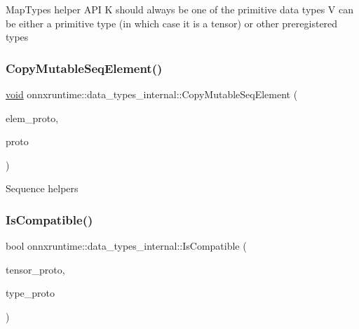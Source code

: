 Map\+Types helper A\+PI K should always be one of the primitive data types V can be either a primitive type (in which case it is a tensor) or other preregistered types \mbox{\label{namespaceonnxruntime_1_1data__types__internal_ae8a105851088c4c54974143738dfd2d5}} 
\subsubsection{\texorpdfstring{Copy\+Mutable\+Seq\+Element()}{CopyMutableSeqElement()}}
{\footnotesize\ttfamily \mbox{\hyperlink{mlasi_8h_a88f941d423cb2a819b70a1358982b1a6}{void}} onnxruntime\+::data\+\_\+types\+\_\+internal\+::\+Copy\+Mutable\+Seq\+Element (\begin{DoxyParamCaption}\item[{const O\+N\+N\+X\+\_\+\+N\+A\+M\+E\+S\+P\+A\+C\+E\+::\+Type\+Proto \&}]{elem\+\_\+proto,  }\item[{O\+N\+N\+X\+\_\+\+N\+A\+M\+E\+S\+P\+A\+C\+E\+::\+Type\+Proto \&}]{proto }\end{DoxyParamCaption})}

Sequence helpers \mbox{\label{namespaceonnxruntime_1_1data__types__internal_a9099f278b70ba024c5728c05e11897ee}} 
\subsubsection{\texorpdfstring{Is\+Compatible()}{IsCompatible()}\hspace{0.1cm}{\footnotesize\ttfamily [1/5]}}
{\footnotesize\ttfamily bool onnxruntime\+::data\+\_\+types\+\_\+internal\+::\+Is\+Compatible (\begin{DoxyParamCaption}\item[{const O\+N\+N\+X\+\_\+\+N\+A\+M\+E\+S\+P\+A\+C\+E\+::\+Type\+Proto\+\_\+\+Tensor \&}]{tensor\+\_\+proto,  }\item[{const O\+N\+N\+X\+\_\+\+N\+A\+M\+E\+S\+P\+A\+C\+E\+::\+Type\+Proto\+\_\+\+Tensor \&}]{type\+\_\+proto }\end{DoxyParamCaption})}


